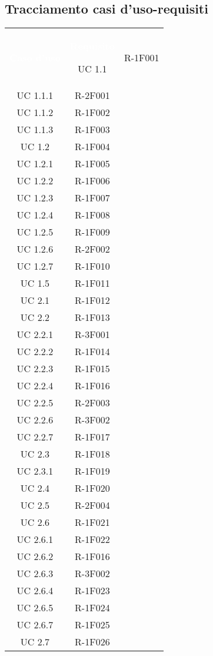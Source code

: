 \subsection{Tracciamento casi d'uso-requisiti} 

\begin{tabularx}{\textwidth}{c|c}
	\rowcolor{greySWEight}
	\textcolor{white}{\textbf{Caso d'uso}} &
	\textcolor{white}{\textbf{Requisito}}\endhead
	
		UC 1.1 & R-1F001 \\
		UC 1.1.1 & R-2F001 \\
		UC 1.1.2 & R-1F002 \\
		UC 1.1.3 & R-1F003 \\
		UC 1.2 & R-1F004 \\
		UC 1.2.1 & R-1F005 \\
		UC 1.2.2 & R-1F006 \\
		UC 1.2.3 & R-1F007 \\
		UC 1.2.4 & R-1F008 \\
		UC 1.2.5 & R-1F009 \\
		UC 1.2.6 & R-2F002 \\
		UC 1.2.7 & R-1F010 \\
		UC 1.5 & R-1F011 \\
		UC 2.1 & R-1F012 \\
		UC 2.2 & R-1F013 \\
		UC 2.2.1 & R-3F001 \\
		UC 2.2.2 & R-1F014 \\
		UC 2.2.3 & R-1F015 \\
		UC 2.2.4 & R-1F016 \\
		UC 2.2.5 & R-2F003 \\
		UC 2.2.6 & R-3F002 \\
		UC 2.2.7 & R-1F017 \\
		UC 2.3 & R-1F018 \\
		UC 2.3.1 & R-1F019 \\
		UC 2.4 & R-1F020 \\
		UC 2.5 & R-2F004 \\
		UC 2.6 & R-1F021 \\
		UC 2.6.1 & R-1F022 \\
		UC 2.6.2 & R-1F016 \\
		UC 2.6.3 & R-3F002 \\
		UC 2.6.4 & R-1F023 \\
		UC 2.6.5 & R-1F024 \\
		UC 2.6.7 & R-1F025 \\
		UC 2.7 & R-1F026 \\

\end{tabularx}
